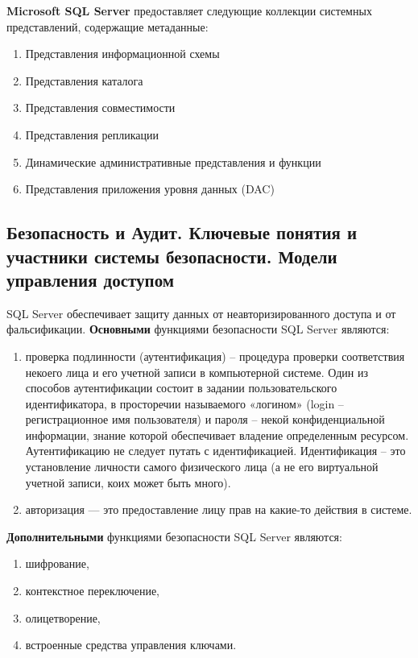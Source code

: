 \textbf{Microsoft SQL Server} предоставляет следующие коллекции системных
представлений, содержащие метаданные:

\begin{enumerate}
	\item Представления информационной схемы
	\item Представления каталога
	\item Представления совместимости
	\item Представления репликации
	\item Динамические административные представления и функции
	\item Представления приложения уровня данных (DAC)
\end{enumerate}

\newpage
\subsection{Безопасность и Аудит. Ключевые понятия и участники системы безопасности. Модели управления доступом}

SQL Server обеспечивает защиту данных от неавторизированного
доступа и от фальсификации. \textbf{Основными} функциями безопасности
SQL Server являются:

\begin{enumerate}
	\item проверка подлинности (аутентификация) – процедура проверки
	соответствия некоего лица и его учетной записи в компьютерной
	системе. Один из способов аутентификации состоит в задании
	пользовательского идентификатора, в просторечии называемого
	«логином» (login – регистрационное имя пользователя) и пароля –
	некой конфиденциальной информации, знание которой обеспечивает
	владение определенным ресурсом. Аутентификацию не следует путать с идентификацией. Идентификация – это установление личности самого физического лица (а не его виртуальной учетной записи, коих может быть много).
	\item авторизация --- это предоставление лицу прав на какие-то действия в
	системе.
\end{enumerate}


\textbf{Дополнительными} функциями безопасности SQL Server являются:

\begin{enumerate}
	\item шифрование,
	\item контекстное переключение,
	\item олицетворение,
	\item встроенные средства управления ключами.
\end{enumerate}

